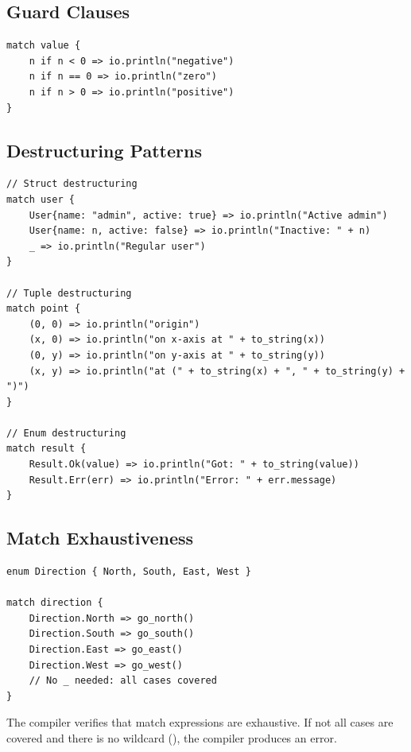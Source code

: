 \subsection{Guard Clauses}

\begin{lstlisting}
match value {
    n if n < 0 => io.println("negative")
    n if n == 0 => io.println("zero")
    n if n > 0 => io.println("positive")
}
\end{lstlisting}

\subsection{Destructuring Patterns}

\begin{lstlisting}
// Struct destructuring
match user {
    User{name: "admin", active: true} => io.println("Active admin")
    User{name: n, active: false} => io.println("Inactive: " + n)
    _ => io.println("Regular user")
}

// Tuple destructuring
match point {
    (0, 0) => io.println("origin")
    (x, 0) => io.println("on x-axis at " + to_string(x))
    (0, y) => io.println("on y-axis at " + to_string(y))
    (x, y) => io.println("at (" + to_string(x) + ", " + to_string(y) + ")")
}

// Enum destructuring
match result {
    Result.Ok(value) => io.println("Got: " + to_string(value))
    Result.Err(err) => io.println("Error: " + err.message)
}
\end{lstlisting}

\subsection{Match Exhaustiveness}

\begin{lstlisting}
enum Direction { North, South, East, West }

match direction {
    Direction.North => go_north()
    Direction.South => go_south()
    Direction.East => go_east()
    Direction.West => go_west()
    // No _ needed: all cases covered
}
\end{lstlisting}

\begin{note}
The compiler verifies that match expressions are exhaustive. If not all cases are covered and there is no wildcard (\code{\_}), the compiler produces an error.
\end{note}

